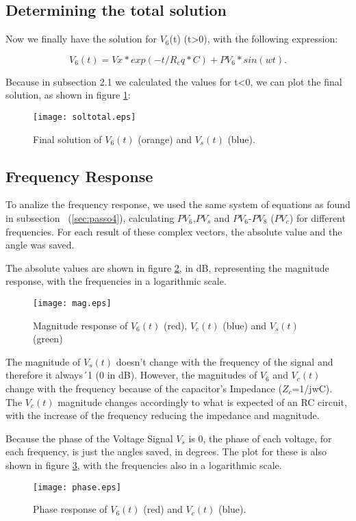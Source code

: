 \subsection{Determining the total solution}

Now we finally have the solution for $V_6$(t) (t>0), with the following expression:

\begin{equation}
  V_6(t)=Vx*exp(-t/R_eq*C)+PV_6*sin(wt).
  \label{eq:totalsol}
\end{equation}

Because in subsection 2.1 we calculated the values for t<0, we can plot the final solution, as shown in figure \ref{fig:soltotal}:

\begin{figure}[h] \centering
\texttt{[image: soltotal.eps]}
\caption{Final solution of $V_6(t)$ (orange) and $V_s(t)$ (blue).}
\label{fig:soltotal}
\end{figure}


\subsection{Frequency Response}

To analize the frequency response, we used the same system of equations as found in subsection ~(\ref{sec:passo4}), calculating $PV_6$,$PV_s$ and $PV_6$-$PV_8$ ($PV_c$) for different frequencies. For each result of these complex vectors, the absolute value and the angle was saved. 

The absolute values are shown in figure \ref{fig:mag}, in dB, representing the magnitude response, with the frequencies in a logarithmic scale.

\begin{figure}[h] \centering
\texttt{[image: mag.eps]}
\caption{Magnitude response of $V_6(t)$ (red), $V_c(t)$ (blue) and $V_s(t)$ (green)}
\label{fig:mag}
\end{figure}

The magnitude of $V_s(t)$ doesn't change with the frequency of the signal and therefore it always´1 (0 in dB). However, the magnitudes of $V_6$ and $V_c(t)$ change with the frequency because of the capacitor's Impedance ($Z_c$=1/jwC). The $V_c(t)$ magnitude changes accordingly to what is expected of an RC circuit, with the increase of the frequency reducing the impedance and magnitude.

Because the phase of the Voltage Signal $V_s$ is 0, the phase of each voltage, for each frequency, is just the angles saved, in degrees. The plot for these is also shown in figure \ref{fig:phase}, with the frequencies also in a logarithmic scale.

\begin{figure}[h] \centering
\texttt{[image: phase.eps]}
\caption{Phase response of $V_6(t)$ (red) and $V_c(t)$ (blue).}
\label{fig:phase}
\end{figure}

























